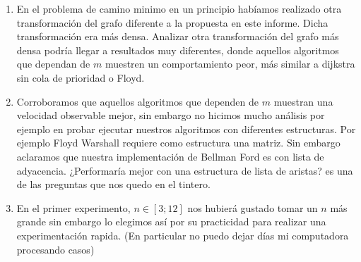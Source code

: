 \documentclass[12pt]{article}
\begin{document}
\begin{enumerate}
	\item En el problema de camino minimo en un principio habíamos realizado otra transformación del grafo diferente a la propuesta en este informe. Dicha transformación era más densa. Analizar otra transformación del grafo más densa podría llegar a resultados muy diferentes, donde aquellos algoritmos que dependan de $m$ muestren un comportamiento peor, más similar a dijkstra sin cola de prioridad o Floyd.
	
	\item Corroboramos que aquellos algoritmos que dependen de $m$ muestran una velocidad observable mejor, sin embargo no hicimos mucho análisis por ejemplo en probar ejecutar nuestros algoritmos con diferentes estructuras. Por ejemplo Floyd Warshall requiere como estructura una matriz. Sin embargo aclaramos que nuestra implementación de Bellman Ford es con lista de adyacencia. ¿Performaría mejor con una estructura de lista de aristas? es una de las preguntas que nos quedo en el tintero.
	
	\item En el primer experimento, $n \in [3; 12]$ nos hubierá gustado tomar un $n$ más grande sin embargo lo elegimos así por su practicidad para realizar una experimentación rapida. (En particular no puedo dejar días mi computadora procesando casos)
\end{enumerate}
\end{document}
